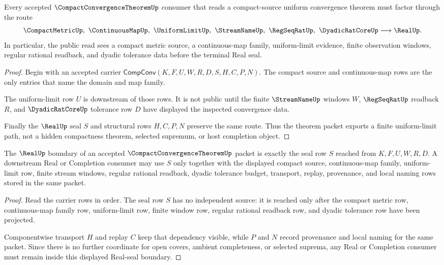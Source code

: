 \begin{theorem}
\label{thm:compact-convergence-theorem-uniform-limit-route}
Every accepted $\CompactConvergenceTheoremUp$ consumer that reads a compact-source uniform convergence theorem must factor through the route
$$
\CompactMetricUp,\ \ContinuousMapUp,\ \UniformLimitUp,\ \StreamNameUp,\ \RegSeqRatUp,\ \DyadicRatCoreUp
\longrightarrow
\RealUp.
$$
In particular, the public read sees a compact metric source, a continuous-map family, uniform-limit evidence, finite observation windows, regular rational readback, and dyadic tolerance data before the terminal Real seal.
\end{theorem}
\begin{proof}
Begin with an accepted carrier $\mathsf{CompConv}(K,F,U,W,R,D,S,H,C,P,N)$. The compact source and continuous-map rows are the only entries that name the domain and map family.

The uniform-limit row $U$ is downstream of those rows. It is not public until the finite $\StreamNameUp$ windows $W$, $\RegSeqRatUp$ readback $R$, and $\DyadicRatCoreUp$ tolerance row $D$ have displayed the inspected convergence data.

Finally the $\RealUp$ seal $S$ and structural rows $H,C,P,N$ preserve the same route. Thus the theorem packet exports a finite uniform-limit path, not a hidden compactness theorem, selected supremum, or host completion object.
\end{proof}

\begin{theorem}
\label{thm:compact-convergence-theorem-real-seal-boundary}
The $\RealUp$ boundary of an accepted $\CompactConvergenceTheoremUp$ packet is exactly the seal row $S$ reached from $K,F,U,W,R,D$. A downstream Real or Completion consumer may use $S$ only together with the displayed compact source, continuous-map family, uniform-limit row, finite stream windows, regular rational readback, dyadic tolerance budget, transport, replay, provenance, and local naming rows stored in the same packet.
\end{theorem}
\begin{proof}
Read the carrier rows in order. The seal row $S$ has no independent source: it is reached only after the compact metric row, continuous-map family row, uniform-limit row, finite window row, regular rational readback row, and dyadic tolerance row have been projected.

Componentwise transport $H$ and replay $C$ keep that dependency visible, while $P$ and $N$ record provenance and local naming for the same packet. Since there is no further coordinate for open covers, ambient completeness, or selected suprema, any Real or Completion consumer must remain inside this displayed Real-seal boundary.
\end{proof}

